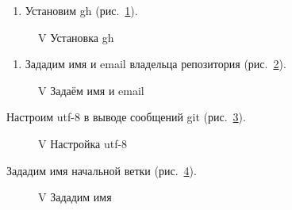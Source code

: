 \documentclass[
  english,
  russian,
  12pt,
  a4paper,
  DIV=11,
  numbers=noendperiod]{scrreprt}
\providecommand{\tightlist}{%
  \setlength{\itemsep}{0pt}\setlength{\parskip}{0pt}}
\begin{document}
\begin{enumerate}
\def\labelenumi{\arabic{enumi})}
\setcounter{enumi}{1}
\tightlist
\item
  Установим gh (рис.~\ref{fig-002}).
\end{enumerate}

\begin{figure}


\caption{\label{fig-002}V Установка gh}

\end{figure}%

\begin{enumerate}
\def\labelenumi{\arabic{enumi})}
\setcounter{enumi}{2}
\tightlist
\item
  Зададим имя и email владельца репозитория (рис.~\ref{fig-003}).
\end{enumerate}

\begin{figure}


\caption{\label{fig-003}V Задаём имя и email}

\end{figure}%

Настроим utf-8 в выводе сообщений git (рис.~\ref{fig-004}).

\begin{figure}


\caption{\label{fig-004}V Настройка utf-8}

\end{figure}%

Зададим имя начальной ветки (рис.~\ref{fig-005}).

\begin{figure}


\caption{\label{fig-005}V Зададим имя}

\end{figure}%
\end{document}
